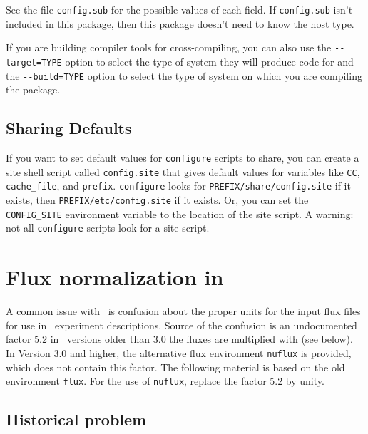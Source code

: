 \begin{appendix}
See the file \verb+config.sub+ for the possible values of each field.  If
\verb+config.sub+ isn't included in this package, then this package doesn't
need to know the host type.

   If you are building compiler tools for cross-compiling, you can also
use the \verb+--target=TYPE+ option to select the type of system they will
produce code for and the \verb+--build=TYPE+ option to select the type of
system on which you are compiling the package.

\section*{Sharing Defaults}

   If you want to set default values for \verb+configure+ scripts to share,
you can create a site shell script called \verb+config.site+ that gives
default values for variables like \verb+CC+, \verb+cache_file+, and \verb+prefix+.
\verb+configure+ looks for \verb+PREFIX/share/config.site+ if it exists, then
\verb+PREFIX/etc/config.site+ if it exists.  Or, you can set the
\verb+CONFIG_SITE+ environment variable to the location of the site script.
A warning: not all \verb+configure+ scripts look for a site script.






\chapter{Flux normalization in \GLOBES }
\label{app:flux}

A common issue with \GLOBES\ is confusion about the proper units for
the input flux files for use in \AEDL\ experiment descriptions. Source of
the confusion is an undocumented factor 5.2 in \GLOBES\ versions older
than 3.0 the fluxes are multiplied with (see below). In Version 3.0 and 
higher, the alternative flux environment {\tt nuflux} is provided, 
which does not contain this factor. The following material is
based on the old environment {\tt flux}. For the use of {\tt nuflux},
replace the factor 5.2 by unity.

\section*{Historical problem}


\end{appendix}
